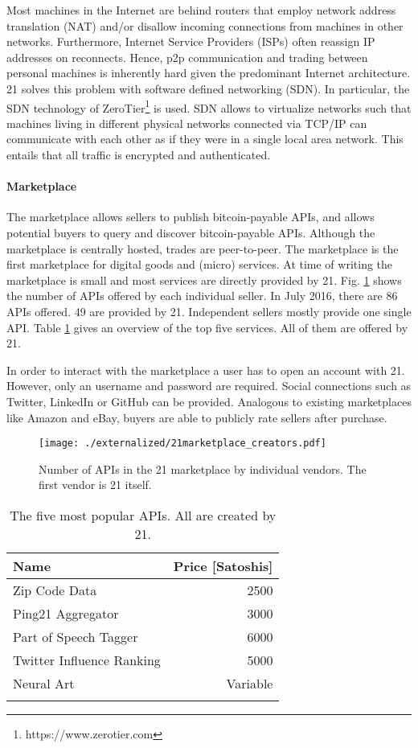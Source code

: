 Most machines in the Internet are behind routers that employ network address translation (NAT) and/or disallow incoming connections from machines in other networks. Furthermore, Internet Service Providers (ISPs) often reassign IP addresses on reconnects. Hence, p2p communication and trading between personal machines is inherently hard given the predominant Internet architecture. 21 solves this problem with software defined networking (SDN). In particular, the SDN technology of ZeroTier\footnote{https://www.zerotier.com} is used. SDN allows to virtualize networks such that machines living in different physical networks connected via TCP/IP can communicate with each other as if they were in a single local area network. This entails that all traffic is encrypted and authenticated. 

\paragraph{Marketplace}

The marketplace allows sellers to publish bitcoin-payable APIs, and allows potential buyers to query and discover bitcoin-payable APIs. Although the marketplace is centrally hosted, trades are peer-to-peer. The marketplace is the first marketplace for digital goods and (micro) services. At time of writing the marketplace is small and most services are directly provided by 21. Fig. \ref{fig:21marketplace} shows the number of APIs offered by each individual seller. In July 2016, there are 86 APIs offered. 49 are provided by 21. Independent sellers mostly provide one single API. Table \ref{tbl:21marketplace} gives an overview of the top five services. All of them are offered by 21. 

In order to interact with the marketplace a user has to open an account with 21. However, only an username and password are required. Social connections such as Twitter, LinkedIn or GitHub can be provided. Analogous to existing marketplaces like Amazon and eBay, buyers are able to publicly rate sellers after purchase.  

\begin{figure}
\centering
\texttt{[image: ./externalized/21marketplace\_creators.pdf]}
\caption{Number of APIs in the 21 marketplace by individual vendors. The first vendor is 21 itself.}
\label{fig:21marketplace}
\end{figure}


\begin{table}
\centering
\begin{tabular}{lr}
    \toprule
    Name & Price [Satoshis] \\
    \midrule
    Zip Code Data & 2500 \\
    Ping21 Aggregator & 3000 \\
    Part of Speech Tagger & 6000 \\
    Twitter Influence Ranking & 5000 \\
    Neural Art & Variable \\
    \bottomrule
    \label{tbl:21marketplace}
  \end{tabular}
  \caption{The five most popular APIs. All are created by 21.}
  \end{table}
 

